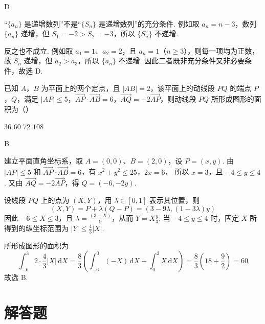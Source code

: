 \begin{answer}
D
\end{answer}

\begin{solution}
“\(\{a_n\}\) 是递增数列”不是“\(\{S_n\}\) 是递增数列”的充分条件. 例如取 \(a_n=n-3\)，数列 \(\{a_n\}\) 递增，但 \(S_1=-2>S_2=-3\)，所以 \(\{S_n\}\) 不递增.

反之也不成立. 例如取 \(a_1=1\)、\(a_2=2\)，且 \(a_n=1\)（\(n\ge3\)），则每一项均为正数，故 \(S_n\) 递增，但 \(a_2>a_3\)，所以 \(\{a_n\}\) 不递增. 因此二者既非充分条件又非必要条件，故选 D.
\end{solution}

\begin{problem}
已知 \(A\)，\(B\) 为平面上的两个定点，且 \(\lvert AB\rvert=2\)，该平面上的动线段 \(PQ\) 的端点 \(P\)，\(Q\)，满足 \(\lvert AP\rvert\le5\)，\(\overrightarrow{AP}\cdot\overrightarrow{AB}=6\)，\(\overrightarrow{AQ}=-2\overrightarrow{AP}\)，则动线段 \(PQ\) 所形成图形的面积为（\quad）

\choices
    {\(36\)}
    {\(60\)}
    {\(72\)}
    {\(108\)}
\end{problem}

\begin{answer}
B
\end{answer}

\begin{solution}
建立平面直角坐标系，取 \(A=(0,0)\)、\(B=(2,0)\)，设 \(P=(x,y)\). 由 \(\lvert AP\rvert\le5\) 和 \(\overrightarrow{AP}\cdot\overrightarrow{AB}=6\)，有
\(x^2+y^2\le25\)，\(2x=6\)，
所以 \(x=3\)，且 \(-4\le y\le4\). 又由 \(\overrightarrow{AQ}=-2\overrightarrow{AP}\)，得 \(Q=(-6,-2y)\).

设线段 \(PQ\) 上的点为 \((X,Y)\)，用 \(\lambda\in[0,1]\) 表示其位置，则
\[
(X,Y)=P+\lambda(Q-P)=(3-9\lambda,(1-3\lambda)y)
\]
因此 \(-6\le X\le3\)，且 \(\lambda=\frac{(3-X)}{9}\)，从而 \(Y=X\frac{y}{3}\). 当 \(-4\le y\le4\) 时，固定 \(X\) 所得到的纵坐标范围为 \(\lvert Y\rvert\le\frac43\lvert X\rvert\).

所形成图形的面积为
\[
\int_{-6}^{3}2\cdot\frac43\lvert X\rvert\,\mathrm dX
=\frac83\left(\int_{-6}^{0}(-X)\,\mathrm dX+\int_{0}^{3}X\,\mathrm dX\right)
=\frac83\left(18+\frac92\right)=60
\]
故选 B.
\end{solution}

\section{解答题}

